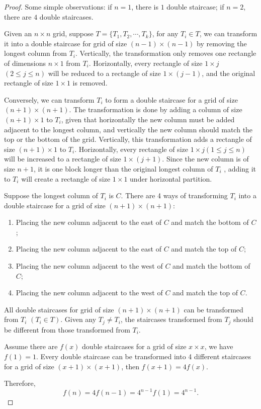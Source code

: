 \documentclass[11pt, oneside]{article}   	%
\begin{document}
\begin{proof}

Some simple observations: if $n=1$, there is $1$ double staircase; if $n=2$, there are $4$ double staircases. 


Given an $n\times n$ grid, suppose $T=\{T_1, T_2, \cdots, T_k\}$, for any $T_i \in T$, we can transform it into a double staircase for grid of size $(n-1)\times (n-1)$ by removing the longest column from $T_i$. Vertically, the transformation only removes one rectangle of dimensions $n\times 1$ from $T_i$. Horizontally, every rectangle of size $1\times j$ $(2\le j \le n)$ will be reduced to a rectangle of size $1\times (j-1)$, and the original rectangle of size $1\times 1$ is removed. 

Conversely, we can transform $T_i$ to form a double staircase for a grid of size $(n+1)\times (n+1)$. The transformation is done by adding a column of size $(n+1)\times 1$ to $T_i$, given that horizontally the new column must be added adjacent to the longest column, and  vertically the new column should match the top or the bottom of the grid. Vertically, this transformation adds a rectangle of size $(n+1)\times 1$ to $T_i$. Horizontally, every rectangle of size $1\times j (1\le j \le n)$ will be increased to a rectangle of size $1\times (j+1)$. Since the new column is of size $n+1$, it is one block longer than the original longest column of $T_i$ , adding it to $T_i$ will create a rectangle of size $1\times1$ under horizontal partition.

Suppose the longest column of $T_i$ is $C$. There are 4 ways of transforming $T_i$ into a double staircase for a grid of size $(n+1)\times (n+1)$: 
\begin{enumerate}
\item Placing the new column adjacent to the east of $C$ and match the bottom of $C$; 
\item Placing the new column adjacent to the east of $C$ and match the top of $C$; 
\item Placing the new column adjacent to the west of $C$ and match the bottom of $C$; 
\item Placing the new column adjacent to the west of $C$ and match the top of $C$.
\end{enumerate}

All double staircases for grid of size $(n+1)\times (n+1)$ can be transformed from $T_i $ $(T_i\in T)$. Given any $T_j \ne T_i$, the staircases transformed from $T_j$ should be different from those transformed from $T_i$. 

Assume there are $f(x)$ double staircases for a grid of size $x\times x$, we have $f(1)= 1$. Every double staircase can be transformed into 4 different staircases for a grid of size $(x+1)\times (x+1)$, then $f(x+1) = 4f(x)$. 

Therefore, 
\[f(n)= 4f(n-1) = 4^{n-1} f(1)=4^{n-1}.\]

\end{proof}
\end{document}
